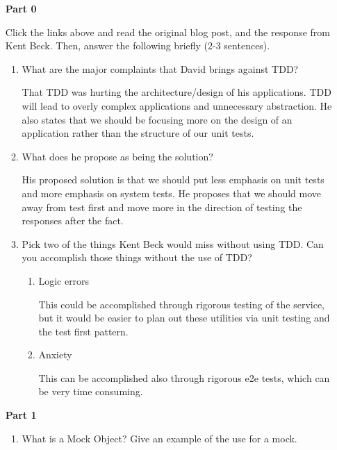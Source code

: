 \begin{enumerate}
	\item[\bf{Part 0}]
	
		Click the links above and read the original blog post, and the response from Kent Beck. Then, answer the following briefly (2-3 sentences).
		
		\begin{enumerate}
			\item What are the major complaints that David brings against TDD?
			
			That TDD was hurting the architecture/design of his applications.  TDD will lead to overly complex applications and unnecessary abstraction. He also states that we should be focusing more on the design of an application rather than the structure of our unit tests.
			
			\item What does he propose as being the solution?
			
			His proposed solution is that we should put less emphasis on unit tests and more emphasis on system tests.  He proposes that we should move away from test first and move more in the direction of testing the responses after the fact.
			
			\item Pick two of the things Kent Beck would miss without using TDD. Can you accomplish those things without the use of TDD?
			
				\begin{enumerate}
					\item Logic errors
					
					This could be accomplished through rigorous testing of the service, but it would be easier to plan out these utilities via unit testing and the test first pattern.
					
					\item Anxiety
					
					This can be accomplished also through rigorous e2e tests, which can be very time consuming.
					
				\end{enumerate}
		\end{enumerate}	
		
	\item[\bf{Part 1}]
	
		\begin{enumerate}
			
			\item What is a Mock Object? Give an example of the use for a mock.
				

\end{enumerate}
\end{enumerate}
